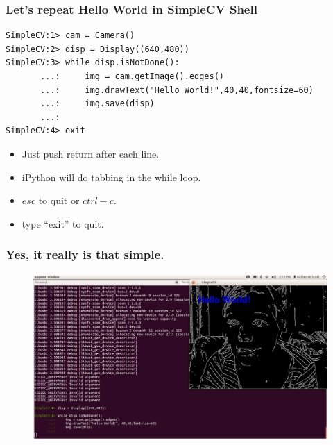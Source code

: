 \documentclass{beamer}
\begin{document}
\begin{frame}[fragile] 
\frametitle{Let's repeat Hello World  in SimpleCV  Shell}
\begin{example}
\begin{verbatim}
SimpleCV:1> cam = Camera()
SimpleCV:2> disp = Display((640,480))
SimpleCV:3> while disp.isNotDone():
       ...:     img = cam.getImage().edges()
       ...:     img.drawText("Hello World!",40,40,fontsize=60)
       ...:     img.save(disp)
       ...:     
SimpleCV:4> exit
\end{verbatim}
\end{example}
\begin{itemize}
\item Just push return after each line.
\item iPython will do tabbing in the while loop.
\item $esc$ to quit or $ctrl-c$.
\item type ``exit'' to quit.
\end{itemize}
\end{frame}
\begin{frame}
\frametitle{Yes, it really is that simple.}
\begin{figure}
  \includegraphics[width=0.9\linewidth]{HelloWorld2.png}
\end{figure}
\end{frame}
\end{document}
